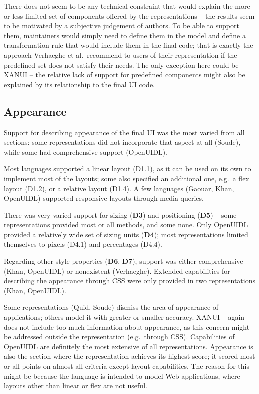 There does not seem to be any technical constraint that would explain the more or less limited set of components offered by the representations -- the results seem to be motivated by a subjective judgement of authors.
To be able to support them, maintainers would simply need to define them in the model and define a transformation rule that would include them in the final code;
that is exactly the approach Verhaeghe et al.\ recommend to users of their representation if the predefined set does not satisfy their needs.
The only exception here could be XANUI -- the relative lack of support for predefined components might also be explained by its relationship to the final UI code.

\subsection{Appearance}\label{subsec:4-2-appearance}
Support for describing appearance of the final UI was the most varied from all sections: some representations did not incorporate that aspect at all (Soude), while some had comprehensive support (OpenUIDL).

Most languages supported a linear layout (D1.1), as it can be used on its own to implement most of the layouts;
some also specified an additional one, e.g.\ a flex layout (D1.2), or a relative layout (D1.4).
A few languages (Gaouar, Khan, OpenUIDL) supported responsive layouts through media queries.

There was very varied support for sizing (\textbf{D3}) and positioning (\textbf{D5}) -- some representations provided most or all methods, and some none.
Only OpenUIDL provided a relatively wide set of sizing units (\textbf{D4});
most representations limited themselves to pixels (D4.1) and percentages (D4.4).

Regarding other style properties (\textbf{D6}, \textbf{D7}), support was either comprehensive (Khan, OpenUIDL) or nonexistent (Verhaeghe).
Extended capabilities for describing the appearance through CSS were only provided in two representations (Khan, OpenUIDL).

Some representations (Quid, Soude) dismiss the area of appearance of applications;
others model it with greater or smaller accuracy.
XANUI -- again -- does not include too much information about appearance, as this concern might be addressed outside the representation (e.g.\ through CSS).
Capabilities of OpenUIDL are definitely the most extensive of all representations.
Appearance is also the section where the representation achieves its highest score;
it scored most or all points on almost all criteria except layout capabilities.
The reason for this might be because the language is intended to model Web applications, where layouts other than linear or flex are not useful.

